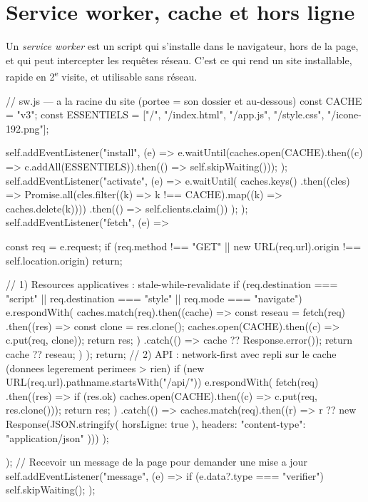 \documentclass[12pt,a4paper,twoside,openright]{book}
\begin{document}
\section{Service worker, cache et hors ligne}
\label{sec-pwa}

Un \emph{service worker} est un script qui s'installe dans le navigateur, hors de la page,
et qui peut intercepter les requ\^etes r\'eseau. C'est ce qui rend un site installable, rapide en
2\textsuperscript{e} visite, et utilisable sans r\'eseau.

\begin{codejs}
// sw.js --- a la racine du site (portee = son dossier et au-dessous)
const CACHE = "v3";
const ESSENTIELS = ["/", "/index.html", "/app.js", "/style.css", "/icone-192.png"];

self.addEventListener("install", (e) => {
  e.waitUntil(caches.open(CACHE).then((c) => c.addAll(ESSENTIELS)).then(() => self.skipWaiting()));
});
self.addEventListener("activate", (e) => {
  e.waitUntil(
    caches.keys()
      .then((cles) => Promise.all(cles.filter((k) => k !== CACHE).map((k) => caches.delete(k))))
      .then(() => self.clients.claim())
  );
});
self.addEventListener("fetch", (e) => {
  const req = e.request;
  if (req.method !== "GET" || new URL(req.url).origin !== self.location.origin) return;

  // 1) Resources applicatives : stale-while-revalidate
  if (req.destination === "script" || req.destination === "style" || req.mode === "navigate") {
    e.respondWith(
      caches.match(req).then((cache) => {
        const reseau = fetch(req)
          .then((res) => { const clone = res.clone(); caches.open(CACHE).then((c) => c.put(req, clone)); return res; })
          .catch(() => cache ?? Response.error());
        return cache ?? reseau;
      })
    );
    return;
  }
  // 2) API : network-first avec repli sur le cache (donnees legerement perimees > rien)
  if (new URL(req.url).pathname.startsWith("/api/")) {
    e.respondWith(
      fetch(req)
        .then((res) => { if (res.ok) caches.open(CACHE).then((c) => c.put(req, res.clone())); return res; })
        .catch(() => caches.match(req).then((r) => r ?? new Response(JSON.stringify({ horsLigne: true }), { headers: { "content-type": "application/json" } })))
    );
  }
});
// Recevoir un message de la page pour demander une mise a jour
self.addEventListener("message", (e) => { if (e.data?.type === "verifier") self.skipWaiting(); });
\end{codejs}
\end{document}
